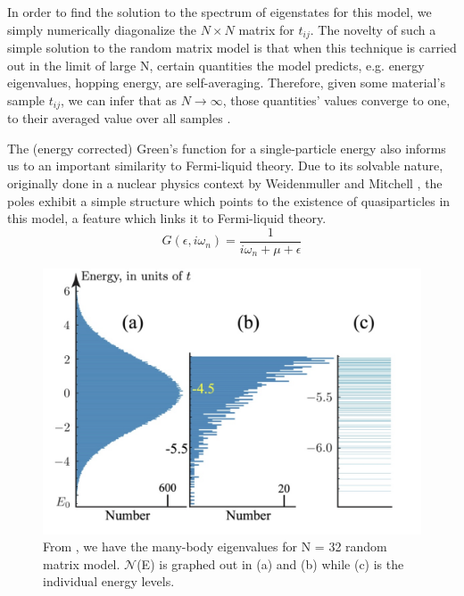 \documentclass[reprint]{revtex4-2}
\begin{document}
In order to find the solution to the spectrum of eigenstates for this model, we simply numerically diagonalize the $N \times N$ matrix for $t_{ij}$. The novelty of such a simple solution to the random matrix model is that when this technique is carried out in the limit of large N, certain quantities the model predicts, e.g. energy eigenvalues, hopping energy,  are self-averaging. Therefore, given some material's sample $t_{ij}$, we can infer that as $N \rightarrow \infty$, those quantities' values converge to one, to their averaged value over all samples \cite{Chowdhury_2022}.
\par The (energy corrected) Green's function for a single-particle energy also informs us to an important similarity to Fermi-liquid theory. Due to its solvable nature, originally done in a nuclear physics context by Weidenmuller and Mitchell \cite{Weidenm_ller_2009}, the poles exhibit a simple structure which points to the existence of quasiparticles in this model, a feature which links it to Fermi-liquid theory.
\begin{equation} \label{eq:4}
    G(\epsilon, i \omega_{n}) = \frac{1}{i\omega_{n} + \mu + \epsilon}
\end{equation}
\begin{figure}
    \centering
    \includegraphics[scale = 0.4]{RandomMatrixSpectrum.jpeg}
    \caption{From \cite{Chowdhury_2022}, we have the many-body eigenvalues for N = 32 random matrix model. $\mathcal{N}$(E) is graphed out in (a) and (b) while (c) is the individual energy levels.}
    \label{Fig1}
\end{figure}
\end{document}
